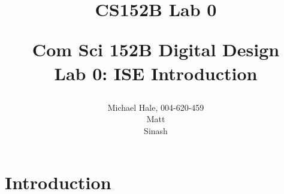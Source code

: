 \documentclass[11pt]{article}
\title{CS152B Lab 0}
\begin{document}
	
\title{\vspace{-0.5in} Com Sci 152B Digital Design \\
	Lab 0: ISE Introduction \\
	\author{Michael Hale, 004-620-459 \\ Matt \\ Sinash}}
\date{}
\maketitle

\section*{Introduction}
\end{document}
